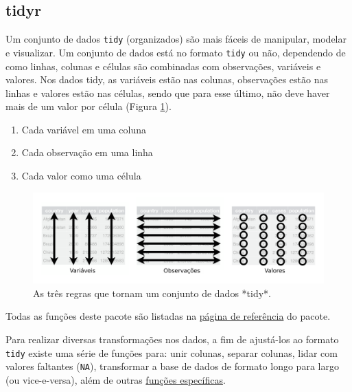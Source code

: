 \documentclass[
]{article}
\providecommand{\tightlist}{%
  \setlength{\itemsep}{0pt}\setlength{\parskip}{0pt}}
\begin{document}
\hypertarget{tidyr}{%
\subsection{tidyr}\label{tidyr}}

Um conjunto de dados \texttt{tidy} (organizados) são mais fáceis de manipular, modelar e visualizar. Um conjunto de dados está no formato \texttt{tidy} ou não, dependendo de como linhas, colunas e células são combinadas com observações, variáveis e valores. Nos dados tidy, as variáveis estão nas colunas, observações estão nas linhas e valores estão nas células, sendo que para esse último, não deve haver mais de um valor por célula (Figura \ref{fig:fig-r-dados-tidy}).

\begin{enumerate}
\def\labelenumi{\arabic{enumi}.}
\tightlist
\item
  Cada variável em uma coluna
\item
  Cada observação em uma linha
\item
  Cada valor como uma célula
\end{enumerate}

\begin{figure}
\includegraphics[width=83.33in]{figures/cap05_fig02} \caption{As três regras que tornam um conjunto de dados *tidy*.}\label{fig:fig-r-dados-tidy}
\end{figure}

Todas as funções deste pacote são listadas na \href{https://tidyr.tidyverse.org/reference/index.html}{página de referência} do pacote.

Para realizar diversas transformações nos dados, a fim de ajustá-los ao formato \texttt{tidy} existe uma série de funções para: unir colunas, separar colunas, lidar com valores faltantes (\texttt{NA}), transformar a base de dados de formato longo para largo (ou vice-e-versa), além de outras \href{https://tidyr.tidyverse.org/reference/index.html}{funções específicas}.
\end{document}

